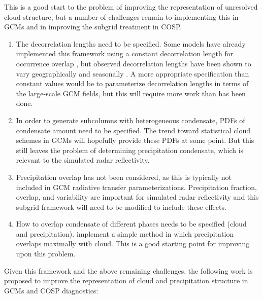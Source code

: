 \documentclass{article}
\begin{document}
This is a good start to the problem of improving the representation of unresolved cloud structure, but a number of challenges remain to implementing this in GCMs and in improving the subgrid treatment in COSP.
\begin{enumerate}
\item The decorrelation lengths need to be specified. Some models have already implemented this framework using a constant decorrelation length for occurrence overlap \citep[e.g.,][]{donner_et_al_2011}, but observed decorrelation lengths have been shown to vary geographically and seasonally \citep{hogan_and_illingworth_2000,mace_and_benson-troth_2002,barker_2008}. A more appropriate specification than constant values would be to parameterize decorrelation lengths in terms of the large-scale GCM fields, but this will require more work than has been done.
\item In order to generate subcolumns with heterogeneous condensate, PDFs of condensate amount need to be specified. The trend toward statistical cloud schemes in GCMs \citep[e.g,][]{tompkins_2002,golaz_et_al_2002} will hopefully provide these PDFs at some point. But this still leaves the problem of determining precipitation condensate, which is relevant to the simulated radar reflectivity.
\item Precipitation overlap has not been considered, as this is typically not included in GCM radiative transfer parameterizations. Precipitation fraction, overlap, and variability are important for simulated radar reflectivity and this subgrid framework will need to be modified to include these effects.
\item How to overlap condensate of different phases needs to be specified (cloud and precipitation). \cite{dimichele_et_al_2012} implement a simple method in which precipitation overlaps maximally with cloud. This is a good starting point for improving upon this problem.
\end{enumerate}

Given this framework and the above remaining challenges, the following work is proposed to improve the representation of cloud and precipitation structure in GCMs and COSP diagnostics:
\end{document}
